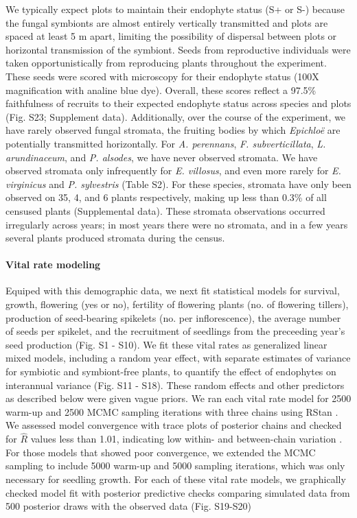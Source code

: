 \documentclass[12pt]{article}
\begin{document}
We typically expect plots to maintain their endophyte status (S+ or S-) because the fungal symbionts are almost entirely vertically transmitted and plots are {\color{red}spaced at least 5 m apart}, limiting the possibility of dispersal between plots or horizontal transmission of the symbiont. 
Seeds from reproductive individuals were taken opportunistically from reproducing plants throughout the experiment. 
These seeds were scored with microscopy for their endophyte status  (100X magnification with analine blue dye).  
Overall, these scores reflect a 97.5\% faithfulness of recruits to their expected endophyte status across species and plots (Fig. S23; Supplement data). 
Additionally, over the course of the experiment, we have rarely observed fungal stromata, the fruiting bodies by which \emph{Epichlo\"e} are potentially transmitted horizontally. 
For \emph{A. perennans}, \emph{F. subverticillata}, \emph{L. arundinaceum}, and \emph{P. alsodes}, we have never observed stromata. 
We have observed stromata only infrequently for \emph{E. villosus}, and even more rarely for \emph{E. virginicus} and \emph{P. sylvestris} (Table S2). 
For these species, stromata have only been observed on 35, 4, and 6 plants respectively, making up less than 0.3\% of all censused plants (Supplemental data).
These stromata observations occurred irregularly across years; in most years there were no stromata, and in a few years several plants produced stromata during the census. 

\paragraph*{Vital rate modeling}
Equiped with this demographic data, we next fit statistical models for survival, growth, flowering (yes or no), fertility of flowering plants (no. of flowering tillers),  production of seed-bearing spikelets (no. per inflorescence), the average number of seeds per spikelet, and the recruitment of seedlings from the preceeding year's seed production (Fig. S1 - S10).  
We fit these vital rates as generalized linear mixed models, including a random year effect, with separate estimates of variance for symbiotic and symbiont-free plants, to quantify the effect of endophytes on interannual variance (Fig. S11 - S18).
These random effects and other predictors as described below were given vague priors.
We ran each vital rate model for 2500 warm-up and 2500 MCMC sampling iterations with three chains using RStan \cite{rstan2022}. 
We assessed model convergence with trace plots of posterior chains and checked for $\hat{R}$ values less than 1.01, indicating low within- and between-chain variation \cite{brooks1998general,gelman2006data}. 
For those models that showed poor convergence, we extended the MCMC sampling to include 5000 warm-up and 5000 sampling iterations, which was only necessary for seedling growth. 
For each of these vital rate models, we graphically checked model fit with posterior predictive checks comparing simulated data from 500 posterior draws with the observed data (Fig. S19-S20)
\end{document}
